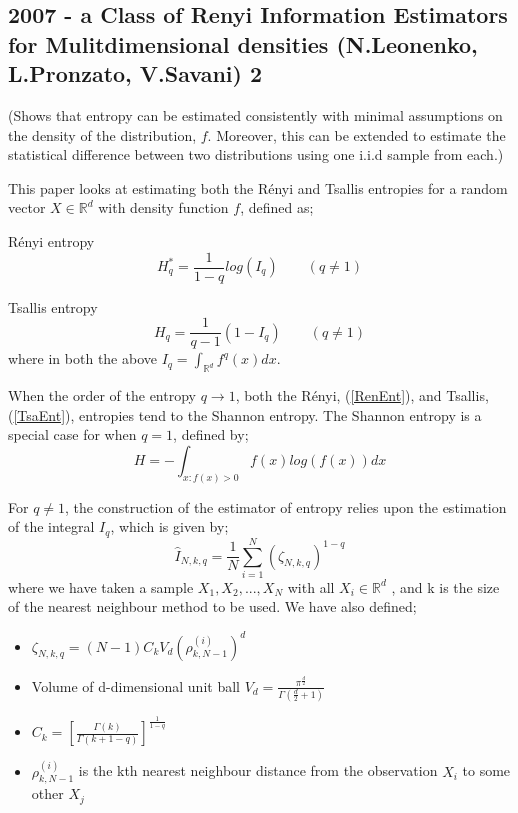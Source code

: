 \documentclass{article}
\begin{document}
\subsection{2007 - a Class of Renyi Information Estimators for Mulitdimensional densities (N.Leonenko, L.Pronzato, V.Savani) 2}

(Shows that entropy can be estimated consistently with minimal assumptions on the density of the distribution, $f$. Moreover, this can be extended to estimate the statistical difference between two distributions using one i.i.d sample from each.)

This paper looks at estimating both the R\'enyi and Tsallis entropies for a random vector $X \in \mathbb{R}^d$ with density function $f$, defined as;

R\'enyi entropy
\begin{equation}
H_{q}^{*} = \frac{1}{1-q} log(I_{q}) \quad  \quad (q \neq 1) \label{RenEnt} 
\end{equation}

Tsallis entropy
\begin{equation}
H_{q} = \frac{1}{q-1} (1 -  I_{q}) \quad  \quad (q \neq 1) \label{TsaEnt} 
\end{equation}
where in both the above $I_{q} = \int_{\mathbb{R}^d} f^q (x) dx$.

When the order of the entropy $q \to 1$, both the R\'enyi, (\ref{RenEnt}), and Tsallis, (\ref{TsaEnt}), entropies tend to the Shannon entropy. The Shannon entropy is a special case for when $q=1$, defined by;
\begin{equation} 
H = - \int_{x : f(x) > 0} f(x) log(f(x)) dx \label{ShaEnt} 
\end{equation} 

For $q \neq 1$, the construction of the estimator of entropy relies upon the estimation of the integral $I_{q}$, which is given by;
\begin{equation}
\hat{I}_{N, k, q} = \frac{1}{N} \sum_{i=1}^{N} (\zeta_{N, k, q})^{1-q}
\end{equation}
where we have taken a sample $X_{1}, X_{2}, ..., X_{N}$ with all $X_{i} \in \mathbb{R}^{d}$ , and k is the size of the nearest neighbour method to be used. We have also defined;
\begin{itemize}
\item $\zeta_{N, k ,q} = (N-1)C_{k}V_{d}(\rho_{k, N-1}^{(i)})^d$
\item Volume of d-dimensional unit ball $V_{d} = \frac{\pi^{\frac{d}{2}}}{\Gamma(\frac{d}{2} + 1 )}$
\item $C_{k} = \left[ \frac{\Gamma(k)}{\Gamma(k+1-q)} \right]^{\frac{1}{1-q}}$
\item $\rho_{k, N-1}^{(i)}$ is the kth nearest neighbour distance from the observation $X_{i}$ to some other $X_{j}$
\end{itemize}
\end{document}
